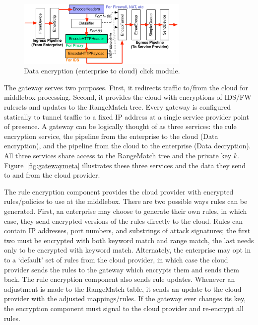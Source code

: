 \begin{figure}[t]
  \centering
  \includegraphics[width=3.25in]{fig/gatewaydiag}
  \caption[]{\label{fig:gateway} Data encryption (enterprise to cloud) click module.}
\end{figure}

The gateway serves two purposes. First, it redirects traffic to/from the cloud for middlebox processing. Second, it provides the cloud with encryptions of IDS/FW rulesets and updates to the RangeMatch tree.
Every gateway is configured statically to tunnel traffic to a fixed IP address at a single service provider point of presence.
A gateway can be logically thought of as three services: the rule encryption service, the pipeline from the enterprise to the cloud (Data encryption), and the pipeline from the cloud to the enterprise (Data decryption). 
All three services share access to the RangeMatch tree and the private key $k$.
Figure~\ref{fig:gatewaymeta} illustrates  these three services and the data they send to and from the cloud provider.

 The rule encryption component provides the cloud provider with encrypted rules/policies to use at the middlebox. 
There are two possible ways rules can be generated. First, an enterprise may choose to generate their own rules, in which case, they send encrypted versions of the rules directly to the cloud.
Rules can contain IP addresses, port numbers, and substrings of attack signatures; the first two must be encrypted with both keyword match and range match, the last needs only to be encrypted with keyword match.
Alternately, the enterprise may opt in to a `default' set of rules from the cloud provider, in which case the cloud provider sends the rules to the gateway which encrypts them and sends them back.
The rule encryption component also sends rule updates. Whenever an adjustment is made to the RangeMatch table, it sends an update to the cloud provider with the adjusted mappings/rules.
If the gateway ever changes its key, the encryption component must signal to the cloud provider and re-encrypt all rules.

